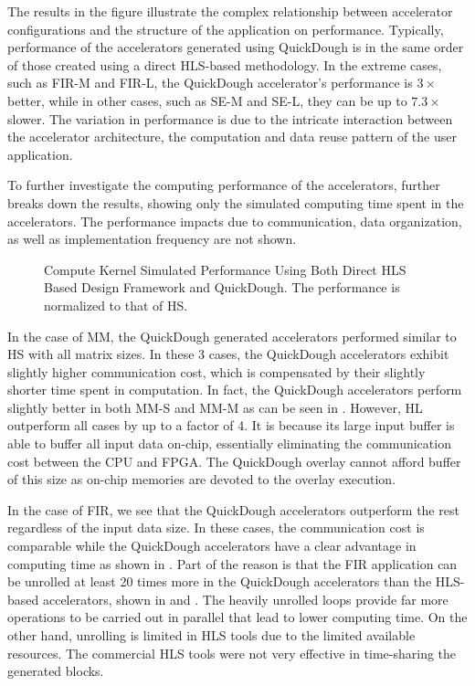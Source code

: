 The results in the figure illustrate the complex relationship between accelerator configurations and
the structure of the application on performance. Typically, performance of the accelerators
generated using QuickDough is in the same order of those created using a direct HLS-based
methodology.  In the extreme cases, such as FIR-M and FIR-L, the QuickDough accelerator's
performance is $3\times$ better, while in other cases, such as SE-M and SE-L, they can be up
to $7.3\times$ slower. The variation in performance is due to the intricate interaction between the
accelerator architecture, the computation and data reuse pattern of the user application.

To further investigate the computing performance of the accelerators, 
further breaks down the results, showing only the simulated computing time spent in the
accelerators. The performance impacts due to communication, data organization, as well as
implementation frequency are not shown.

\begin{figure}
\caption{Compute Kernel Simulated Performance Using Both Direct HLS Based Design Framework and
QuickDough. The performance is normalized to that of HS.}
\label{fig:kernel-sim-perf}
\end{figure}

In the case of MM, the QuickDough generated accelerators performed similar to HS with all matrix
sizes. In these 3 cases, the QuickDough accelerators exhibit slightly higher communication cost,
which is compensated by their slightly shorter time spent in computation. In fact, the QuickDough
accelerators perform slightly better in both MM-S and MM-M as can be seen in
. However, HL outperform all cases by up to a factor of 4. It is
because its large input buffer is able to buffer all input data on-chip, essentially eliminating the
communication cost between the CPU and FPGA. The QuickDough overlay cannot afford buffer of this
size as on-chip memories are devoted to the overlay execution.

In the case of FIR, we see that the QuickDough accelerators outperform the rest regardless of the
input data size.  In these cases, the communication cost is comparable while the QuickDough
accelerators have a clear advantage in computing time as shown in . Part
of the reason is that the FIR application can be unrolled at least \num{20} times more in the
QuickDough accelerators than the HLS-based accelerators, shown in
 and . The heavily
unrolled loops provide far more operations to be carried out in parallel that lead to lower
computing time. On the other hand, unrolling is limited in HLS tools due to the limited available
resources. The commercial HLS tools were not very effective in time-sharing the generated blocks.

